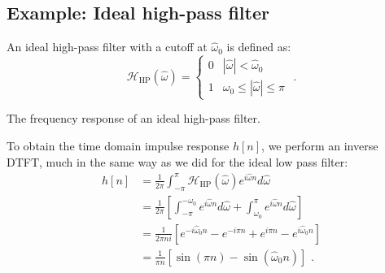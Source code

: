 \subsection{Example: Ideal high-pass filter}

An ideal high-pass filter with a cutoff at $\hat{\omega}_0$ is defined as:
\begin{equation}
\mathcal{H}_{\mathrm{HP}}(\hat{\omega}) = \left\{ \begin{array}{cc}
0 & |\hat{\omega}| < \hat{\omega}_0\\
1 & \omega_0 \le |\hat{\omega}| \le \pi
\end{array}\right.\,\,.
\end{equation}
\begin{marginfigure}
\begin{center}
\end{center}
\caption{The frequency response of an ideal high-pass filter.}
\end{marginfigure}
To obtain the time domain impulse response $h[n]$, we perform an
inverse DTFT, much in the same way as we did for the ideal low pass
filter:
\begin{align}
h[n] &= \frac{1}{2\pi}\int_{-\pi}^{\pi} \mathcal{H}_{\mathrm{HP}}(\hat{\omega}) e^{i\hat{\omega}n} d\hat{\omega}\\
&=\frac{1}{2\pi}\left[\int_{-\pi}^{-\omega_0} e^{i\hat{\omega}n} d\hat{\omega} + \int_{\omega_0}^{\pi} e^{i\hat{\omega}n} d\hat{\omega} \right]\\
&=\frac{1}{2\pi ni}\left[ e^{-i\hat{\omega}_0 n} - e^{-i\pi n} + e^{i\pi n} - e^{i\hat{\omega}_0 n} \right]\\
&=\frac{1}{\pi n}\left[\sin(\pi n) - \sin(\hat{\omega}_0  n) \right]\,\,.
\end{align}
